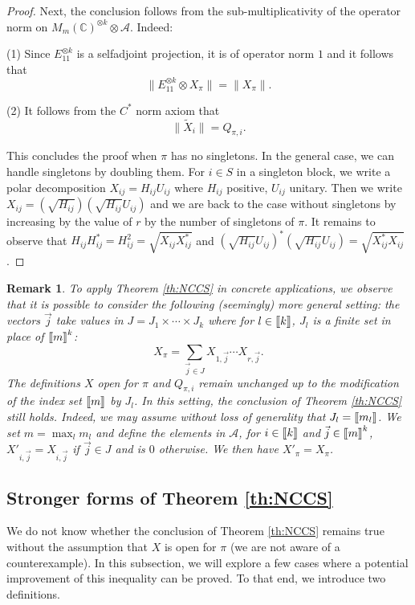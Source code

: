 \documentclass[11pt]{article}
\newtheorem{remark}[lemma]{Remark}
\newcommand{\cA}{\mathcal{A}}
\newcommand{\1}{1\!\!{\sf I}}
\newcommand{\INT}[1]{{{\left[\hspace{-1.4pt}\left[#1\right]\hspace{-1.4pt}\right]}}}
\begin{document}
\begin{proof}
Next, the conclusion follows from the sub-multiplicativity of the operator norm on $M_m(\mathbb{C})^{\otimes k}\otimes \cA$.
Indeed:

(1) Since $E_{11}^{\otimes k}$ is a selfadjoint projection, it is of operator norm $1$ and it follows that 
$$\|E_{11}^{\otimes k}\otimes X_{\pi}\|=\| X_{\pi}\|.$$

(2) It follows from the $C^*$ norm axiom that $$\|\tilde{X}_i\|=Q_{\pi,i}.$$


This concludes the proof when  $\pi$ has no singletons. In the general case, we can handle singletons by doubling them. 
For $i \in S$ in a singleton block, we write a polar decomposition $X_{ij}=H_{ij}U_{ij}$ where $H_{ij}$ positive, $U_{ij}$ unitary.
Then we write $X_{ij}=(\sqrt{H_{ij}}) (\sqrt{H_{ij}}U_{ij})$ and we are back to the case without singletons by increasing by the value of $r$ by the number of singletons of $\pi$. It remains to observe that $H_{ij} H_{ij}^* = H_{ij}^2 = \sqrt{X_{ij}X_{ij}^*} $ and $(\sqrt{H_{ij}}U_{ij})^* (\sqrt{H_{ij}}U_{ij}) = \sqrt{X_{ij}^*X_{ij}}$. \end{proof}


\begin{remark}\label{rk:NCCS}To apply Theorem \ref{th:NCCS} in concrete applications, we observe that it is possible to consider the following (seemingly) more general setting: the vectors $\vec j$ take values in $J = J_1 \times \cdots \times J_k$ where for $l \in \INT{k}$, $J_l $ is a finite set in place of $\INT{m}^k$: 
$$
X_\pi = \sum_{\vec j  \in J} X_{1,\vec j}\cdots X_{r,\vec j}.
$$
The definitions $X$ open for $\pi$ and $Q_{\pi,i}$ remain unchanged up to the modification of the index set $\INT{m}$ by $J_l$. In this setting, the conclusion of Theorem \ref{th:NCCS} still holds. Indeed, we may assume without loss of generality that $J_l = \INT{m_l}$. We set $m = \max_l m_l$ and define the elements in $\cA$, for $i \in \INT{k}$ and $\vec j \in \INT{m}^k$, $X'_{i,\vec j} = X_{i,\vec j}$  if $\vec j \in J$ and is $0$ otherwise. We then have $X'_\pi = X_{\pi}$.
\end{remark}

\subsection{Stronger forms of Theorem \ref{th:NCCS} }
\label{subsec:NCCStheta}
We do not know whether the conclusion of Theorem \ref{th:NCCS} remains true without the assumption that $X$ is open for $\pi$ (we are not aware of a counterexample). In this subsection, we will explore a few cases where a potential improvement of this inequality can be proved. To that end, we introduce two definitions. 
\end{document}
